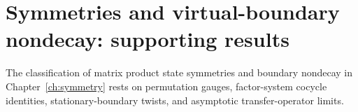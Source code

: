 \chapter{Symmetries and virtual-boundary nondecay: supporting results}
\label{ch:symmetry_supporting_results}

The classification of matrix product state symmetries and boundary nondecay
in Chapter~\ref{ch:symmetry} rests on permutation gauges, factor-system cocycle
identities, stationary-boundary twists, and asymptotic transfer-operator
limits.




